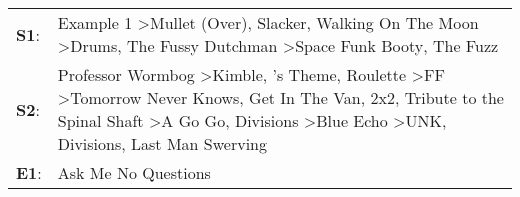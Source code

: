 \begin{supertabular}{p{0.03\textwidth}p{0.92\textwidth}}
 \textbf{S1}:  &                                                                                                                                                                                                                                                                                                                   Example 1\textsuperscript{} \textgreater \enspace Mullet (Over)\textsuperscript{}, \enspace Slacker\textsuperscript{}, \enspace Walking On The Moon\textsuperscript{} \textgreater \enspace Drums\textsuperscript{}, \enspace The Fussy Dutchman\textsuperscript{} \textgreater \enspace Space Funk Booty\textsuperscript{}, \enspace The Fuzz\textsuperscript{}  \enspace  \\
 \textbf{S2}:  &  Professor Wormbog\textsuperscript{} \textgreater \enspace Kimble\textsuperscript{}, 's Theme\textsuperscript{}, \enspace Roulette\textsuperscript{} \textgreater \enspace FF\textsuperscript{} \textgreater \enspace Tomorrow Never Knows\textsuperscript{}, \enspace Get In The Van\textsuperscript{}, \enspace 2x2\textsuperscript{}, \enspace Tribute to the Spinal Shaft\textsuperscript{} \textgreater \enspace A Go Go\textsuperscript{}, \enspace Divisions\textsuperscript{} \textgreater \enspace Blue Echo\textsuperscript{} \textgreater \enspace UNK\textsuperscript{}, \enspace Divisions\textsuperscript{}, \enspace Last Man Swerving\textsuperscript{}  \enspace  \\
 \textbf{E1}:  &                                                                                                                                                                                                                                                                                                                                                                                                                                                                                                                                                                                                                                              Ask Me No Questions\textsuperscript{}  \enspace  \\
\end{supertabular}
